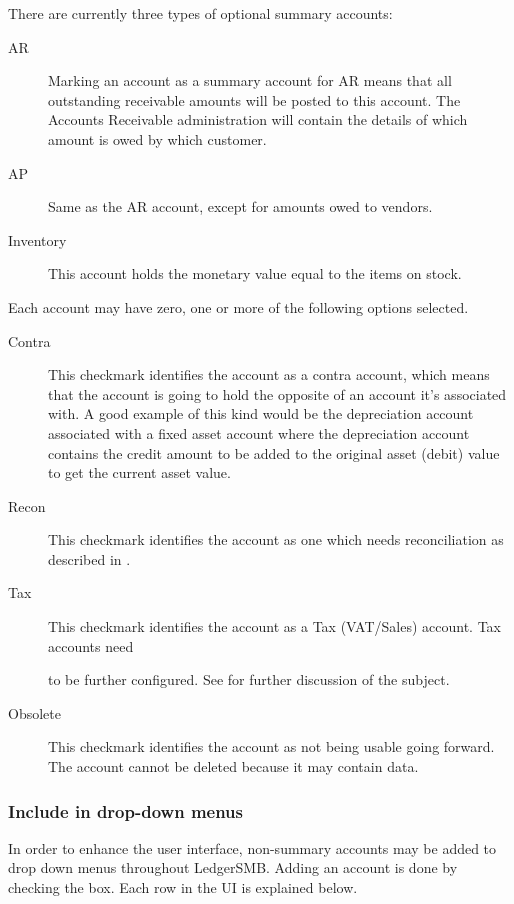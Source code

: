 There are currently three types of optional summary accounts:

\begin{description}
    \item [AR] Marking an account as a summary account for AR means that all outstanding
    receivable amounts will be posted to this account. The Accounts Receivable administration
    will contain the details of which amount is owed by which \gls{customer}.
    \item [AP] Same as the AR account, except for amounts owed to vendors.
    \item [Inventory] This account holds the monetary value equal to the items on stock.
\end{description}

Each account may have zero, one or more of the following options selected.

\begin{description}
    \item[Contra] This checkmark identifies the account as a \gls{contra} account, which means
    that the account is going to hold the opposite of an account it's associated with.
    A good example of this kind would be the depreciation account associated with a fixed
    asset account where the depreciation account contains the credit amount to be added to
    the original asset (debit) value to get the current asset value.
    \item[Recon] This checkmark identifies the account as one which needs reconciliation as
    described in .
    \item[Tax] This checkmark identifies the account as a Tax (VAT/Sales) account. Tax accounts need

    to be further configured. See  for further discussion of the
    subject.
    \item[Obsolete] This checkmark identifies the account as not being usable going forward.  The account cannot be deleted because it may
    contain data.
    \label{item:AccountOptionsTax}
\end{description}


\subsubsection{Include in drop-down menus}
\label{subsec-coa-account-links}

In order to enhance the user interface, non-summary accounts may be added to drop down menus throughout LedgerSMB.  Adding
an account is done by checking the box.  Each row in the UI is explained below.

